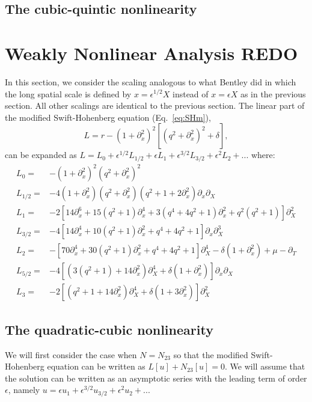 \documentclass[api,pof,pre,12pt,a4paper]{revtex4-1}
\newcommand{\beqn}{\begin{equation}}
\newcommand{\eeqn}{\end{equation}}
\begin{document}
\subsection{The cubic-quintic nonlinearity}


\section{Weakly Nonlinear Analysis REDO}
In this section, we consider the scaling analogous to what Bentley did in which the long spatial scale is defined by $x=\epsilon^{1/2}X$ instead of $x=\epsilon X$ as in the previous section.  All other scalings are identical to the previous section.
The linear part of the modified Swift-Hohenberg equation (Eq.~\ref{eq:SHm}), 
\beqn
L= r-\left(1+\partial_{x}^2\right)^2 \left[\left(q^2+\partial_{x}^2\right)^2+\delta \right],
\eeqn
can be expanded as $L=L_0+\epsilon^{1/2} L_{1/2}+\epsilon L_1+\epsilon^{3/2} L_{3/2}+\epsilon^2 L_2+...$ where:
\begin{subequations}
\begin{align}
L_0 =& -\left(1+\partial_x^2\right)^2 \left(q^2+\partial_x^2\right)^2 \\
L_{1/2} =& -4\left(1+\partial_x^2\right)  \left(q^2+\partial_x^2\right) \left(q^2+1+2 \partial_x^2\right)\partial_x\partial_X \\
L_1 =&- 2 \left[14 \partial_x^6+15  \left(q^2+1\right)\partial_x^4+3 \left(q^4+4 q^2+1\right) \partial_x^2+q^2\left(q^2+1\right)\right] \partial_X^2\\  
L_{3/2} =& -4   \left[ 14 \partial_x^4+10  \left(q^2+1\right)\partial_x^2+q^4+ 4 q^2+1\right]\partial_x \partial_X^3 \\
L_2 =& -\left[ 70 \partial_x^4+30\left(q^2+1\right) \partial_x^2 +q^4 +4 q^2+1\right]\partial_X^4-\delta\left(1 +\partial_x^2\right)+\mu-\partial_T  \\
L_{5/2} =& -4 \left[ \left(3(q^2+1)+14 \partial_x^2\right)\partial_X^4+\delta(1 +\partial_x^2) \right] \partial_x \partial_X  \\
L_{3} =& -2 \left[ \left(q^2+1+14 \partial_x^2\right)\partial_X^4 +\delta(1 +3 \partial_x^2) \right] \partial_X^2 
\end{align}
\end{subequations}

\subsection{The quadratic-cubic nonlinearity}
We will first consider the case when $N=N_{23}$ so that the modified Swift-Hohenberg equation can be written as $L[u]+N_{23}[u]=0$.  We will assume that the solution can be written as an asymptotic series with the leading term of order $\epsilon$, namely $u=\epsilon u_1 + \epsilon^{3/2} u_{3/2} +\epsilon^2 u_2+...$ 
\end{document}
